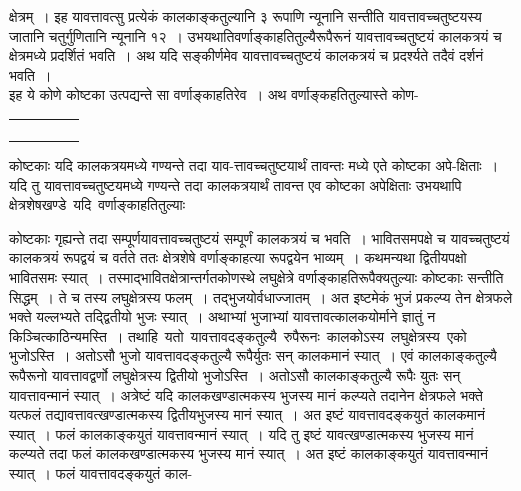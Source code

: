 \documentclass[11pt, openany]{book}
\begin{document}
\vspace{-1mm}

\noindent क्षेत्रम्~। इह यावत्तावत्सु प्रत्येकं कालकाङ्कतुल्यानि ३ रूपाणि न्यूनानि सन्तीति यावत्तावच्चतुष्टयस्य जातानि चतुर्गुणितानि न्यूनानि १२~। उभयथातिवर्णाङ्काहतितुल्यैरूपैरूनं यावत्तावच्चतुष्टयं कालकत्रयं च क्षेत्रमध्ये प्रदर्शितं 
भवति~। अथ यदि सङ्कीर्णमेव यावत्तावच्चतुष्टयं कालकत्रयं च प्रदर्श्यते
तदैवं दर्शनं भवति~। \\

\vspace{-3mm}
 इह ये कोणे कोष्टका उत्पद्यन्ते सा वर्णाङ्काहतिरेव~। अथ वर्णाङ्कहतितुल्यास्ते कोण-
\vspace{-8mm}
 
\begin{flushright}
\begin{minipage}[c]{0.4\textwidth}
\renewcommand{\arraystretch}{0.8}
\begin{tabular}{|l|l|l|l|p{2cm}|}
\hline
 &  &  &  &  \\ \hline
 &  &  &  &  \\ \hline
 &  &  &  &  \\ \hline
 &  &  &  &  \\ 
 &  &  &  &  \\ \hline
\end{tabular}
\end{minipage} 
\hfill
\begin{minipage}{0.56\textwidth} 
कोष्टकाः यदि कालकत्रयमध्ये गण्यन्ते तदा याव-त्तावच्चतुष्टयार्थं तावन्तः मध्ये एते कोष्टका अपे-क्षिताः~। यदि तु यावत्तावच्चतुष्टयमध्ये गण्यन्ते तदा कालकत्रयार्थं तावन्त एव कोष्टका अपेक्षिताः उभयथापि \,क्षेत्रशेषखण्डे \,यदि \,वर्णाङ्काहतितुल्याः 
\end{minipage} 
\end{flushright}
\vspace{-3mm}

\noindent कोष्टकाः गृह्यन्ते तदा
सम्पूर्णयावत्तावच्चतुष्टयं सम्पूर्णं कालकत्रयं च भवति~। भावितसमपक्षे च यावच्चतुष्टयं कालकत्रयं रूपद्वयं च वर्तते ततः क्षेत्रशेषे वर्णाङ्काहत्या रूपद्वयेन भाव्यम्~।
\newpage
\noindent कथमन्यथा द्वितीयपक्षो भावितसमः स्यात्~।
तस्माद्भावितक्षेत्रान्तर्गतकोणस्थे लघुक्षेत्रे वर्णाङ्काहतिरूपैक्यतुल्याः कोष्टकाः सन्तीति सिद्धम्~। ते च तस्य लघुक्षेत्रस्य फलम्~। तद्भुजयोर्वधाज्जातम्~। अत इष्टमेकं 
भुजं प्रकल्प्य तेन क्षेत्रफले भक्ते यल्लभ्यते तद्द्वितीयो भुजः स्यात्~। 
अथाभ्यां भुजाभ्यां यावत्तावत्कालकयोर्माने ज्ञातुं न किञ्चित्काठिन्यमस्ति~। 
तथाहि \,यतो \,यावत्तावदङ्कतुल्यै \,रुपैरूनः \,कालकोऽस्य \,लघुक्षेत्रस्य \,एको \,भुजोऽस्ति~। अतोऽसौ भुजो यावत्तावदङ्कतुल्यै रूपैर्युतः सन् कालकमानं 
स्यात्~। एवं कालकाङ्कतुल्यै रूपैरूनो यावत्तावद्वर्णो लघुक्षेत्रस्य द्वितीयो 
भुजोऽस्ति~। अतोऽसौ कालकाङ्कतुल्यै रूपैः युतः सन् यावत्तावन्मानं स्यात्~। 
अत्रेष्टं यदि कालकखण्डात्मकस्य भुजस्य मानं कल्प्यते तदानेन क्षेत्रफले 
भक्ते यत्फलं तद्यावत्तावत्खण्डात्मकस्य द्वितीयभुजस्य मानं स्यात्~। अत 
इष्टं यावत्तावदङ्कयुतं कालकमानं स्यात्~। फलं कालकाङ्कयुतं यावत्तावन्मानं
स्यात्~। यदि तु इष्टं यावत्खण्डात्मकस्य भुजस्य मानं कल्प्यते तदा 
फलं कालकखण्डात्मकस्य भुजस्य मानं स्यात्~। अत इष्टं कालकाङ्कयुतं 
यावत्तावन्मानं स्यात्~। फलं यावत्तावदङ्कयुतं काल-
\vspace{-4mm}
\end{document}
